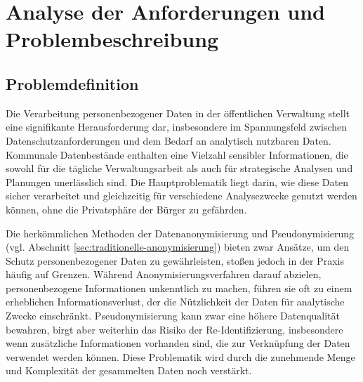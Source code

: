 \chapter{Analyse der Anforderungen und Problembeschreibung}
\label{cha:anforderungsanalyse}

\section{Problemdefinition}
\begin{spacing}{1.5}

Die Verarbeitung personenbezogener Daten in der öffentlichen Verwaltung stellt eine signifikante Herausforderung dar, insbesondere im Spannungsfeld zwischen Datenschutzanforderungen und dem Bedarf an analytisch nutzbaren Daten. Kommunale Datenbestände enthalten eine Vielzahl sensibler Informationen, die sowohl für die tägliche Verwaltungsarbeit als auch für strategische Analysen und Planungen unerlässlich sind. Die Hauptproblematik liegt darin, wie diese Daten sicher verarbeitet und gleichzeitig für verschiedene Analysezwecke genutzt werden können, ohne die Privatsphäre der Bürger zu gefährden.

Die herkömmlichen Methoden der Datenanonymisierung und Pseudonymisierung (vgl. Abschnitt \ref{sec:traditionelle-anonymisierung}) bieten zwar Ansätze, um den Schutz personenbezogener Daten zu gewährleisten, stoßen jedoch in der Praxis häufig auf Grenzen. Während Anonymisierungsverfahren darauf abzielen, personenbezogene Informationen unkenntlich zu machen, führen sie oft zu einem erheblichen Informationsverlust, der die Nützlichkeit der Daten für analytische Zwecke einschränkt. Pseudonymisierung kann zwar eine höhere Datenqualität bewahren, birgt aber weiterhin das Risiko der Re-Identifizierung, insbesondere wenn zusätzliche Informationen vorhanden sind, die zur Verknüpfung der Daten verwendet werden können. Diese Problematik wird durch die zunehmende Menge und Komplexität der gesammelten Daten noch verstärkt.


\end{spacing}
